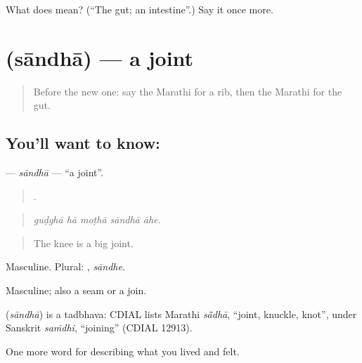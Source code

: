\begin{tcolorbox}[breakable,colback=teal!4,colframe=teal!35!black,title={Before you move on}]
What does  mean? (\textquotedblleft{}The gut; an intestine\textquotedblright{}.) Say it once more.
\end{tcolorbox}
\section[\texorpdfstring{\mr{सांधा} (sāndhā)}{सांधा (sāndhā)}]{ (sāndhā) — a joint}

\label{lesson:MR-C478-sandha}



\begin{quote}
Before the new one: say the Marathi for a rib, then the Marathi for the gut.
\end{quote}

\subsection*{You'll want to know: }
\textbf{} — \emph{sāndhā} — \textquotedblleft{}a joint\textquotedblright{}.

\begin{quote}
    .
\end{quote}

\begin{quote}
\emph{guḍghā hā moṭhā sāndhā āhe.}
\end{quote}

\begin{quote}
The knee is a big joint.
\end{quote}

Masculine. Plural: , \emph{sāndhe}.

Masculine; also a seam or a join.

\begin{cousinweb}
\textbf{} (\emph{sāndhā}) is a tadbhava: CDIAL lists Marathi \emph{sā̃dhā}, \textquotedblleft{}joint, knuckle, knot\textquotedblright{}, under Sanskrit \emph{saṁdhi}, \textquotedblleft{}joining\textquotedblright{} (CDIAL 12913).
\end{cousinweb}

\begin{grammarlens}[title={What you've built}]
One more word for describing what you lived and felt.
\end{grammarlens}


